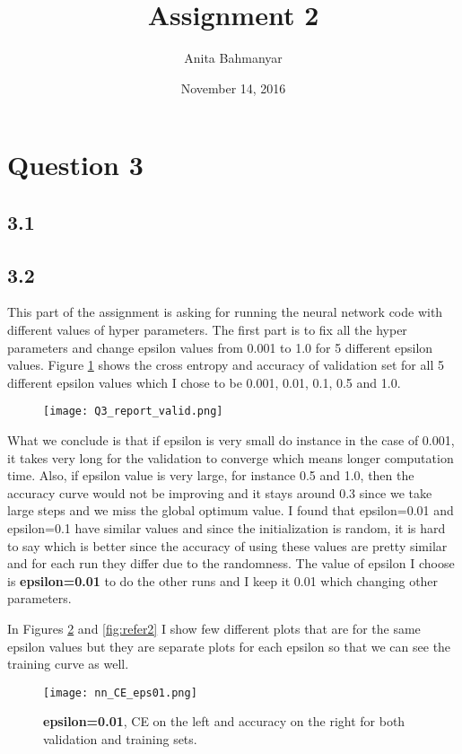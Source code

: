 \documentclass[10pt]{article}
\title{Assignment 2}
\author{Anita Bahmanyar}
\date{November 14, 2016}
\begin{document}
\maketitle


\section*{Question 3}
\subsection*{3.1}

\subsection*{3.2}
This part of the assignment is asking for running the neural network code with different values of hyper parameters. The first part is to fix all the hyper parameters and change epsilon values from 0.001 to 1.0 for 5 different epsilon values.
Figure \ref{fig:Q3_valid_combined} shows the cross entropy and accuracy of validation set for all 5 different epsilon values which I chose to be 0.001, 0.01, 0.1, 0.5 and 1.0.
\begin{figure}[H]
	\centering
	\texttt{[image: Q3\_report\_valid.png]}
	\caption{}
	\label{fig:Q3_valid_combined}
\end{figure}
What we conclude is that if epsilon is very small do instance in the case of 0.001, it takes very long for the validation to converge which means longer computation time. Also, if epsilon value is very large, for instance 0.5 and 1.0, then the accuracy curve would not be improving and it stays around 0.3 since we take large steps and we miss the global optimum value. I found that epsilon=0.01 and epsilon=0.1 have similar values and since the initialization is random, it is hard to say which is better since the accuracy of using these values are pretty similar and for each run they differ due to the randomness. The value of epsilon I choose is \textbf{epsilon=0.01} to do the other runs and I keep it 0.01 which changing other parameters.

In Figures \ref{fig:refer1} and \ref{fig:refer2} I show few different plots that are for the same epsilon values but they are separate plots for each epsilon so that we can see the training curve as well.
\begin{figure}[H]
	\centering
	\texttt{[image: nn\_CE\_eps01.png]}
	\caption{\textbf{epsilon=0.01}, CE on the left and accuracy on the right for both validation and training sets.}
	\label{fig:refer1}
\end{figure}
\end{document}

